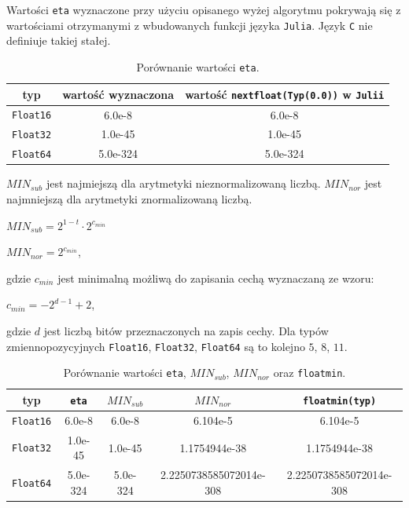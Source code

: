 \documentclass{article}
\begin{document}
\newline
Wartości \texttt{eta} wyznaczone przy użyciu opisanego wyżej algorytmu pokrywają się z wartościami otrzymanymi \newline z wbudowanych funkcji języka \texttt{Julia}. Język \texttt{C} nie definiuje takiej stałej.
\begin{table}[h!]
    \centering
    \begin{tabular}{ |c|c|c| } 
    \hline
    typ & wartość wyznaczona & wartość \texttt{nextfloat(Typ(0.0))} w \texttt{Julii} \\ 
    \hline
    \texttt{Float16} & 6.0e-8 & 6.0e-8 \\ 
    \hline
    \texttt{Float32} & 1.0e-45 & 1.0e-45 \\ 
    \hline
    \texttt{Float64} & 5.0e-324 & 5.0e-324 \\ 
    \hline
    \end{tabular}
    \caption{Porównanie wartości \texttt{eta}.}
\end{table}
\newline
$MIN_{sub}$ jest najmiejszą dla arytmetyki nieznormalizowaną liczbą.  $MIN_{nor}$ jest najmniejszą dla arytmetyki znormalizowaną liczbą.

\begin{center}
    $MIN_{sub} = 2^{1-t} \cdot 2^{c_{min}}$

    $MIN_{nor} = 2^{c_{min}}$,
\end{center}
gdzie $c_{min}$ jest minimalną możliwą do zapisania cechą wyznaczaną ze wzoru:
\begin{center}
    $c_{min} = -2^{d - 1} + 2$,
\end{center}
gdzie $d$ jest liczbą bitów przeznaczonych na zapis cechy. Dla typów zmiennopozycyjnych \texttt{Float16}, \texttt{Float32}, \texttt{Float64} są to kolejno $5$, $8$, $11$.
\begin{table}[h!]
    \centering
    \begin{tabular}{ |c|c|c|c|c| }
    \hline 
    typ & \texttt{eta} & $MIN_{sub}$ & $MIN_{nor}$ & \texttt{floatmin(typ)} \\
    \hline
    \texttt{Float16} & 6.0e-8 & 6.0e-8 & 6.104e-5 & 6.104e-5 \\
    \hline
    \texttt{Float32} & 1.0e-45 & 1.0e-45 & 1.1754944e-38 & 1.1754944e-38 \\
    \hline
    \texttt{Float64} & 5.0e-324 & 5.0e-324 & 2.2250738585072014e-308 & 2.2250738585072014e-308 \\
    \hline
    \end{tabular}
    \caption{Porównanie wartości \texttt{eta}, $MIN_{sub}$, $MIN_{nor}$ oraz \texttt{floatmin}.}
\end{table}
\end{document}

